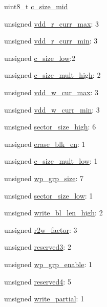 \begin{DoxyCompactItemize}
\item 
uint8\+\_\+t \hyperlink{struct_c_s_d_v1_a3924209b2f4b13545821c70f350992e6}{c\+\_\+size\+\_\+mid}
\item 
unsigned \hyperlink{struct_c_s_d_v1_aa4abe46e7b1435c6fd10d81e7e896a4b}{vdd\+\_\+r\+\_\+curr\+\_\+max}\+: 3
\item 
unsigned \hyperlink{struct_c_s_d_v1_afec7601986197bca644c0d8a0a15792b}{vdd\+\_\+r\+\_\+curr\+\_\+min}\+: 3
\item 
unsigned \hyperlink{struct_c_s_d_v1_a31ff5166624ba6350bf13dc52ea66411}{c\+\_\+size\+\_\+low}\+:2
\item 
unsigned \hyperlink{struct_c_s_d_v1_a9a15f2200f682655454715f7f7940af4}{c\+\_\+size\+\_\+mult\+\_\+high}\+: 2
\item 
unsigned \hyperlink{struct_c_s_d_v1_aea850ac333645608af63e69bcf4e27b3}{vdd\+\_\+w\+\_\+cur\+\_\+max}\+: 3
\item 
unsigned \hyperlink{struct_c_s_d_v1_ac9c6e2a080c566408d4a1d372f9a4072}{vdd\+\_\+w\+\_\+curr\+\_\+min}\+: 3
\item 
unsigned \hyperlink{struct_c_s_d_v1_acfeaa8dfeb8c792f3e1e43d442affaf1}{sector\+\_\+size\+\_\+high}\+: 6
\item 
unsigned \hyperlink{struct_c_s_d_v1_ac15904615b375a2a4a6644fbeb9cc493}{erase\+\_\+blk\+\_\+en}\+: 1
\item 
unsigned \hyperlink{struct_c_s_d_v1_ae03711699c88be17fd8c56885ee825a7}{c\+\_\+size\+\_\+mult\+\_\+low}\+: 1
\item 
unsigned \hyperlink{struct_c_s_d_v1_a7c053e453c019206686f66c08f7b8d10}{wp\+\_\+grp\+\_\+size}\+: 7
\item 
unsigned \hyperlink{struct_c_s_d_v1_ad0784917ed048a2e751dcc3e82d7857f}{sector\+\_\+size\+\_\+low}\+: 1
\item 
unsigned \hyperlink{struct_c_s_d_v1_a1ec000b74733f3d16e105352ba26f177}{write\+\_\+bl\+\_\+len\+\_\+high}\+: 2
\item 
unsigned \hyperlink{struct_c_s_d_v1_a477e3d269e084c6ee559237aefcee729}{r2w\+\_\+factor}\+: 3
\item 
unsigned \hyperlink{struct_c_s_d_v1_a427423bc33b20c59941db0b25d60aee9}{reserved3}\+: 2
\item 
unsigned \hyperlink{struct_c_s_d_v1_a0fedbc5c0834d12ffcbedca0caaea22b}{wp\+\_\+grp\+\_\+enable}\+: 1
\item 
unsigned \hyperlink{struct_c_s_d_v1_a8c0aa397613ce7723033f0f8edccf458}{reserved4}\+: 5
\item 
unsigned \hyperlink{struct_c_s_d_v1_a24149a92c75ebed1c824e4301e1fad40}{write\+\_\+partial}\+: 1

\end{DoxyCompactItemize}
